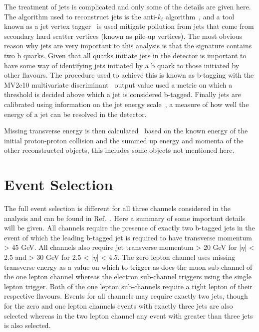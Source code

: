 The treatment of jets is complicated and only some of the details are given here. The algorithm used
to reconstruct jets is the anti-$k_t$ algorithm~\cite{anti-kt}, and a tool known as a jet vertex
tagger~\cite{ATLAS:JVT:2016} is used mitigate pollution from jets that come from secondary hard
scatter vertices (known as pile-up vertices). The most obvious reason why jets are very important to
this analysis is that the signature contains two b quarks. Given that all quarks initiate jets in the
detector is important to have some way of identifying jets initiated by a b quark to those initiated
by other flavours. The procedure used to achieve this is known as b-tagging with the MV2c10
multivariate discriminant~\cite{ATLAS:btag:2017} output value used a metric on which a threshold is
decided above which a jet is considered b-tagged. Finally jets are calibrated using information
on the jet energy scale~\cite{ATLAS:JES:2015, ATLAS:JES:2017}, a measure of how well the energy of a
jet can be resolved in the detector.

Missing transverse energy is then calculated~\cite{ATLAS:exMET-reco:2015, ATLAS:MET-reco:2015} based
on the known energy of the initial proton-proton collision and the summed up energy and momenta of the
other reconstructed objects, this includes some objects not mentioned here.

\section{Event Selection}

The full event selection is different for all three channels considered in the analysis and can be
found in Ref.~\cite{ATLAS-CONF-2018-036}. Here a summary of some important details will be given.
All channels require the presence of exactly two b-tagged jets in the event of which the leading
b-tagged jet is required to have transverse momentum > 45 GeV. All channels also
require jet transverse momentum > 20 GeV for |$\eta$| < 2.5 and > 30 GeV for 2.5 < |$\eta$| < 4.5.
The zero lepton channel uses missing transverse energy as a value on which to trigger as does the
muon sub-channel of the one lepton channel whereas the electron sub-channel triggers using the single
lepton trigger. Both of the one lepton sub-channels require a tight lepton of their respective
flavours. Events for all channels may require exactly two jets, though for the zero and one lepton
channels events with exactly three jets are also selected whereas in the two lepton channel any event
with greater than three jets is also selected.

